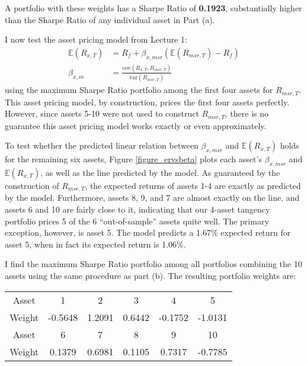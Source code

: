 \documentclass[12pt]{article}
\newcommand{\E}{\mathbb{E}}
\begin{document}
A portfolio with these weights has a Sharpe Ratio of \textbf{0.1923}, substantially higher than the Sharpe Ratio of any individual asset in Part (a).


I now test the asset pricing model from Lecture 1:
\begin{align*}
\mathbb{E}(R_{x,T}) &= R_f + \beta_{x,msr} \left( \mathbb{E}(R_{msr,T}) - R_f \right) \\
\beta_{x,m} &= \frac{\text{cov}(R_{x,T},R_{msr,T})}{\text{var}(R_{msr,T})}
\end{align*}
using the maximum Sharpe Ratio portfolio among the first four assets for $R_{msr,T}$. This asset pricing model, by construction, prices the first four assets perfectly. However, since assets 5-10 were not used to construct $R_{msr,T}$, there is no guarantee this asset pricing model works exactly or even approximately.

To test whether the predicted linear relation between $\beta_{x,msr}$ and $\E(R_{x,T})$ holds for the remaining six assets, Figure \ref{figure_ervsbeta} plots each asset's $\beta_{x,msr}$ and $\E(R_{x,T})$, as well as the line predicted by the model. As guaranteed by the construction of $R_{msr,T}$, the expected returns of assets 1-4 are exactly as predicted by the model. Furthermore, assets 8, 9, and 7 are almost exactly on the line, and assets 6 and 10 are fairly close to it, indicating that our 4-asset tangency portfolio prices 5 of the 6 ``out-of-sample'' assets quite well. The primary exception, however, is asset 5. The model predicts a 1.67\% expected return for asset 5, when in fact its expected return is 1.06\%.


I find the maximum Sharpe Ratio portfolio among all portfolios combining the 10 assets using the same procedure as part (b). The resulting portfolio weights are:

\singlespacing
\begin{center}
\begin{tabular}{cccccc}
\hline
\hline
Asset & 1     & 2     & 3     & 4     & 5 \bigstrut[t]\\
Weight & -0.5648 & 1.2091 & 0.6442 & -0.1752 & -1.0131 \bigstrut[b]\\
\hline
Asset & 6     & 7     & 8     & 9     & 10 \bigstrut[t]\\
Weight & 0.1379 & 0.6981 & 0.1105 & 0.7317 & -0.7785 \bigstrut[b]\\
\hline
\hline
\end{tabular}%
\end{center}
\end{document}
